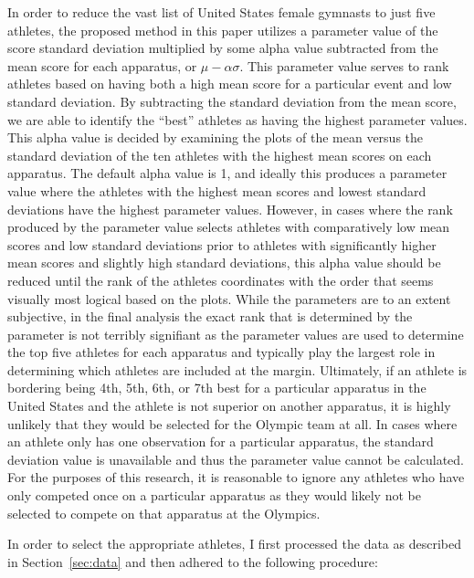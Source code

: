 \documentclass[12pt]{article}
\begin{document}
In order to reduce the vast list of United States female gymnasts to just five athletes, the proposed method in 
this paper utilizes a parameter value of the score standard deviation multiplied by some alpha value subtracted 
from the mean score for each apparatus, or $\mu - \alpha \sigma$. This parameter value serves to rank athletes based 
on having both a high mean score for a particular event and low standard deviation. By subtracting the standard deviation 
from the mean score, we are able to identify the ``best'' athletes as having the highest parameter values. 
This alpha value is decided by examining the plots of the mean versus the standard deviation of the ten athletes 
with the highest mean scores on each apparatus. The default alpha value is 1, and ideally this produces a parameter 
value where the athletes with the highest mean scores and lowest standard deviations have the highest parameter values. 
However, in cases where the rank produced by the parameter value selects athletes with comparatively low mean scores and 
low standard deviations prior to athletes with significantly higher mean scores and slightly high standard deviations, 
this alpha value should be reduced until the rank of the athletes coordinates with the order that seems visually most 
logical based on the plots. While the parameters are to an extent subjective, in the final analysis the exact rank that 
is determined by the parameter is not terribly signifiant as the parameter values are used to determine the top five 
athletes for each apparatus and typically play the largest role in determining which athletes are included at the margin. 
Ultimately, if an athlete is bordering being 4th, 5th, 6th, or 7th best for a particular apparatus in the United States 
and the athlete is not superior on another apparatus, it is highly unlikely that they would be selected for the Olympic 
team at all. In cases where an athlete only has one observation for a particular apparatus, the 
standard deviation value is unavailable and thus the parameter value cannot be calculated. For the purposes of this 
research, it is reasonable to ignore any athletes who have only competed once on a particular apparatus as they would 
likely not be selected to compete on that apparatus at the Olympics.

In order to select the appropriate athletes, I first processed the data as described in Section~\ref{sec:data} 
and then adhered to the following procedure:
\end{document}
